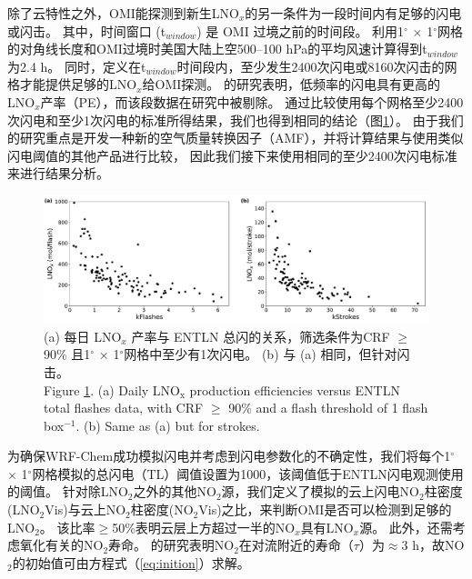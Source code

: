 除了云特性之外，OMI能探测到新生LNO$_x$的另一条件为一段时间内有足够的闪电或闪击。
其中，时间窗口 (t$_{window}$) 是 OMI 过境之前的时间段。
\citet{Lapierre.2020}利用1$^{\circ}$ $\times$ 1$^{\circ}$网格的对角线长度和OMI过境时美国大陆上空500--100 hPa的平均风速计算得到t$_{window}$为2.4 h。
同时，\citet{Lapierre.2020}定义在t$_{window}$时间段内，至少发生2400次闪电或8160次闪击的网格才能提供足够的LNO$_x$给OMI探测。
\citet{Bucsela.2019}的研究表明，低频率的闪电具有更高的LNO$_x$产率（PE），而该段数据在\citet{Lapierre.2020}研究中被剔除。
通过比较使用每个网格至少2400次闪电和至少1次闪电的标准所得结果，我们也得到相同的结论（图\ref{fig:us_flash_threshold}）。
由于我们的研究重点是开发一种新的空气质量转换因子（AMF），并将计算结果与使用类似闪电阈值的其他产品进行比较\citep{Pickering.2016,Lapierre.2020}，
因此我们接下来使用相同的至少2400次闪电标准来进行结果分析。


\begin{figure}[htbp]
    \includegraphics[width=15cm]{./figures/us_flash_threshold.pdf}
    \caption{
    (a) 每日 LNO$_x$ 产率与 ENTLN 总闪的关系，筛选条件为CRF $\geq$ 90\% 且1$^{\circ}$ $\times$ 1$^{\circ}$网格中至少有1次闪电。
     (b) 与 (a) 相同，但针对闪击。\\
    Figure \ref{fig:us_flash_threshold}. (a) Daily LNO$_\textrm{x}$ production efficiencies versus ENTLN total flashes data, with CRF $\geq$ 90\% and a flash threshold of 1 flash box$^{-1}$.
    (b) Same as (a) but for strokes.}
    \label{fig:us_flash_threshold}
\end{figure}


为确保WRF-Chem成功模拟闪电并考虑到闪电参数化的不确定性，我们将每个1$^{\circ}$ $\times$ 1$^{\circ}$网格模拟的总闪电（TL）阈值设置为1000，该阈值低于ENTLN闪电观测使用的阈值。
针对除LNO$_2$之外的其他NO$_2$源，我们定义了模拟的云上闪电NO$_2$柱密度(LNO$_2$Vis)与云上NO$_2$柱密度(NO$_2$Vis)之比，来判断OMI是否可以检测到足够的LNO$_2$。
该比率$\geq$50\%表明云层上方超过一半的NO$_x$具有LNO$_x$源。
此外，还需考虑氧化有关的NO$_2$寿命。
\citet{Nault.2017}的研究表明NO$_2$在对流附近的寿命（$\tau$）为$\approx$3 h，故NO$_2$的初始值可由方程式（\ref{eq:inition}）求解。

